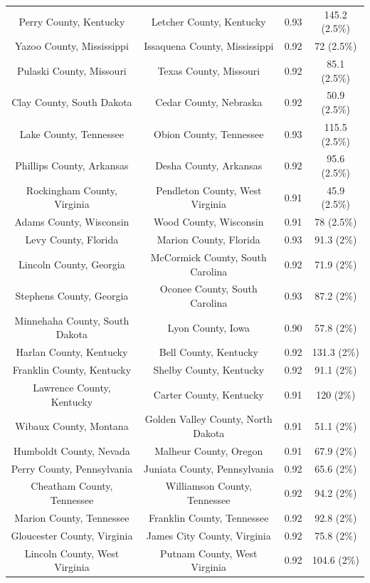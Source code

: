 \begin{longtable}{cccc}
  Perry County, Kentucky & Letcher County, Kentucky & 0.93 & 145.2 (2.5\%) \\ 
  Yazoo County, Mississippi & Issaquena County, Mississippi & 0.92 & 72 (2.5\%) \\ 
  Pulaski County, Missouri & Texas County, Missouri & 0.92 & 85.1 (2.5\%) \\ 
  Clay County, South Dakota & Cedar County, Nebraska & 0.92 & 50.9 (2.5\%) \\ 
  Lake County, Tennessee & Obion County, Tennessee & 0.93 & 115.5 (2.5\%) \\ 
  Phillips County, Arkansas & Desha County, Arkansas & 0.92 & 95.6 (2.5\%) \\ 
  Rockingham County, Virginia & Pendleton County, West Virginia & 0.91 & 45.9 (2.5\%) \\ 
  Adams County, Wisconsin & Wood County, Wisconsin & 0.91 & 78 (2.5\%) \\ 
  Levy County, Florida & Marion County, Florida & 0.93 & 91.3 (2\%) \\ 
  Lincoln County, Georgia & McCormick County, South Carolina & 0.92 & 71.9 (2\%) \\ 
  Stephens County, Georgia & Oconee County, South Carolina & 0.93 & 87.2 (2\%) \\ 
  Minnehaha County, South Dakota & Lyon County, Iowa & 0.90 & 57.8 (2\%) \\ 
  Harlan County, Kentucky & Bell County, Kentucky & 0.92 & 131.3 (2\%) \\ 
  Franklin County, Kentucky & Shelby County, Kentucky & 0.92 & 91.1 (2\%) \\ 
  Lawrence County, Kentucky & Carter County, Kentucky & 0.91 & 120 (2\%) \\ 
  Wibaux County, Montana & Golden Valley County, North Dakota & 0.91 & 51.1 (2\%) \\ 
  Humboldt County, Nevada & Malheur County, Oregon & 0.91 & 67.9 (2\%) \\ 
  Perry County, Pennsylvania & Juniata County, Pennsylvania & 0.92 & 65.6 (2\%) \\ 
  Cheatham County, Tennessee & Williamson County, Tennessee & 0.92 & 94.2 (2\%) \\ 
  Marion County, Tennessee & Franklin County, Tennessee & 0.92 & 92.8 (2\%) \\ 
  Gloucester County, Virginia & James City County, Virginia & 0.92 & 75.8 (2\%) \\ 
  Lincoln County, West Virginia & Putnam County, West Virginia & 0.92 & 104.6 (2\%) \\ 

\end{longtable}
